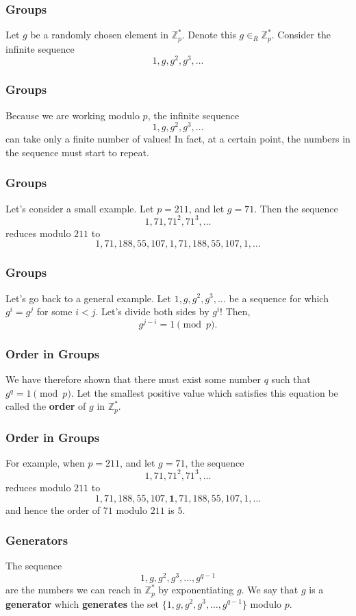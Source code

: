 \documentclass{beamer}
\newcommand{\<}{\langle}
\renewcommand{\>}{\rangle}
\newcommand{\Z}{\mathbb{Z}}
\begin{document}
\begin{frame}
\frametitle{Groups}

Let $g$ be a randomly chosen element in $\Z_p^*$. Denote this $g \in_R \Z_p^*$. Consider the infinite sequence
\[
1, g, g^2, g^3, \dots
\]
\end{frame}


\begin{frame}
\frametitle{Groups}

Because we are working modulo $p$, the infinite sequence
\[
1, g, g^2, g^3, \dots
\]
can take only a finite number of values! In fact, at a certain point, the numbers in the sequence must start to repeat.
\end{frame}


\begin{frame}
\frametitle{Groups}

Let's consider a small example. Let $p=211$, and let $g = 71$. Then the sequence
\[
1, 71, 71^2, 71^3, \dots
\]
reduces modulo $211$ to 
\[
1, 71, 188, 55, 107, 1, 71, 188, 55, 107, 1, \dots
\]
\end{frame}


\begin{frame}
\frametitle{Groups}

Let's go back to a general example. Let $1, g, g^2, g^3, \dots$ be a sequence for which $g^i= g^j$ for some $i < j$. Let's divide both sides by $g^i$! Then,
\[
g^{j-i} = 1 \pmod p.
\]
\end{frame}

\begin{frame}
\frametitle{Order in Groups} 

We have therefore shown that there must exist some number $q$ such that $g^q=1\pmod p$. Let the smallest positive value which satisfies this equation be called the \textbf{order} of $g$ in $\Z_p^*$. 
\end{frame}


\begin{frame}
\frametitle{Order in Groups}

For example, when $p=211$, and let $g = 71$, the sequence
\[
1, 71, 71^2, 71^3, \dots
\]
reduces modulo $211$ to 
\[
1, 71, 188, 55, 107, \mathbf{1}, 71, 188, 55, 107, 1, \dots
\]
and hence the order of $71$ modulo $211$ is $5$.
\end{frame}

\begin{frame}
\frametitle{Generators}

The sequence
\[
1, g, g^2, g^3, \dots, g^{q-1}
\]
are the numbers we can reach in $\Z_p^*$ by exponentiating $g$. We say that $g$ is a \textbf{generator} which \textbf{generates} the set $\{1, g, g^2, g^3, \dots, g^{q-1}\}$ modulo $p$. 
\end{frame}
\end{document}
